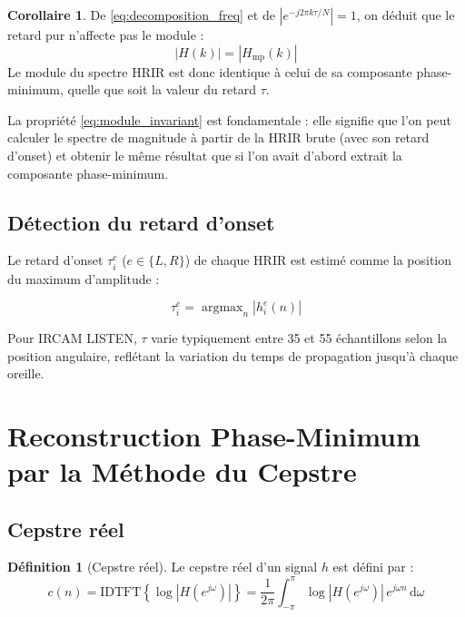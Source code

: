 \documentclass[12pt, a4paper]{article}
\theoremstyle{definition}
\newtheorem{definition}{Définition}[section]
\newtheorem{corollaire}{Corollaire}[section]
\newcommand{\abs}[1]{\left| #1 \right|}
\DeclareMathOperator{\argmax}{argmax}
\begin{document}
\begin{corollaire}
  De \eqref{eq:decomposition_freq} et de $\abs{e^{-j2\pi k\tau/N}} = 1$, on
  déduit que le retard pur n'affecte pas le module :
  \begin{equation}
    \boxed{\abs{H(k)} = \abs{H_{\mathrm{mp}}(k)}}
    \label{eq:module_invariant}
  \end{equation}
  Le module du spectre HRIR est donc identique à celui de sa composante
  phase-minimum, quelle que soit la valeur du retard $\tau$.
\end{corollaire}

La propriété \eqref{eq:module_invariant} est fondamentale : elle signifie que
l'on peut calculer le spectre de magnitude à partir de la HRIR brute
(avec son retard d'onset) et obtenir le même résultat que si l'on avait
d'abord extrait la composante phase-minimum.

\subsection{Détection du retard d'onset}

Le retard d'onset $\tau_i^{e}$ ($e \in \{L, R\}$) de chaque HRIR est estimé
comme la position du maximum d'amplitude :

\begin{equation}
  \tau_i^{e} = \argmax_{n} \abs{h_i^{e}(n)}
  \label{eq:onset}
\end{equation}

Pour IRCAM LISTEN, $\tau$ varie typiquement entre 35 et 55 échantillons selon
la position angulaire, reflétant la variation du temps de propagation jusqu'à
chaque oreille.

\section{Reconstruction Phase-Minimum par la Méthode du Cepstre}

\subsection{Cepstre réel}

\begin{definition}[Cepstre réel]
  Le cepstre réel d'un signal $h$ est défini par :
  \begin{equation}
    c(n) = \mathrm{IDTFT}\left\{\log\abs{H(e^{j\omega})}\right\}
    = \frac{1}{2\pi}\int_{-\pi}^{\pi} \log\abs{H(e^{j\omega})} \, e^{j\omega n} \,\mathrm{d}\omega
  \end{equation}
\end{definition}
\end{document}
